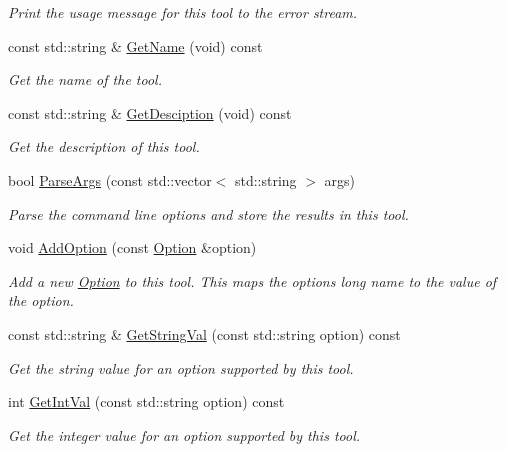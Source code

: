 \begin{DoxyCompactItemize}
\begin{DoxyCompactList}\small\item\em Print the usage message for this tool to the error stream. \end{DoxyCompactList}\item 
const std\+::string \& \hyperlink{classtool_1_1Tool_af2610dfa17e6d51b5f321902b66fc5a3}{Get\+Name} (void) const 
\begin{DoxyCompactList}\small\item\em Get the name of the tool. \end{DoxyCompactList}\item 
const std\+::string \& \hyperlink{classtool_1_1Tool_ad8bc0c17bc21bcdab45c9694c7691551}{Get\+Desciption} (void) const 
\begin{DoxyCompactList}\small\item\em Get the description of this tool. \end{DoxyCompactList}\item 
bool \hyperlink{classtool_1_1Tool_a141fb0e2b3aefd52d17b8626c97a746d}{Parse\+Args} (const std\+::vector$<$ std\+::string $>$ args)
\begin{DoxyCompactList}\small\item\em Parse the command line options and store the results in this tool. \end{DoxyCompactList}\item 
void \hyperlink{classtool_1_1Tool_ab3c5916d3a39dc2774a9d77d6b330529}{Add\+Option} (const \hyperlink{classtool_1_1Option}{Option} \&option)
\begin{DoxyCompactList}\small\item\em Add a new \hyperlink{classtool_1_1Option}{Option} to this tool. This maps the option\textquotesingle{}s long name to the value of the option. \end{DoxyCompactList}\item 
const std\+::string \& \hyperlink{classtool_1_1Tool_a4656da0e2cc8c0991e26222174edcf33}{Get\+String\+Val} (const std\+::string option) const 
\begin{DoxyCompactList}\small\item\em Get the string value for an option supported by this tool. \end{DoxyCompactList}\item 
int \hyperlink{classtool_1_1Tool_a00ddc9710a6b02c791dc75ad4bf8282e}{Get\+Int\+Val} (const std\+::string option) const 
\begin{DoxyCompactList}\small\item\em Get the integer value for an option supported by this tool. \end{DoxyCompactList}\item 

\end{DoxyCompactItemize}
